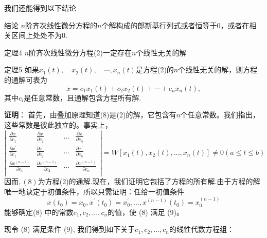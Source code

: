 \documentclass[aspectratio=169, 10pt, utf8, mathserif]{beamer}
\begin{document}
	\begin{frame}
		我们还能得到以下结论
		\begin{alertblock}{结论}
			$n$阶齐次线性微分方程的$n$个解构成的郎斯基行列式或者恒等于0，或者在相关区间上处处不为0.
		\end{alertblock}
	\end{frame}
	\begin{frame}
		\begin{block}{定理4}
			$n$阶齐次线性微分方程(2)一定存在$n$个线性无关的解
		\end{block}
		\begin{block}{定理5}
			如果$x_1(t),\quad x_2(t),\quad\cdots,x_n(t)$是方程(2)的$n$个线性无关的解，则方程的通解可表为
			\begin{equation}
				x=c_1x_1(t)+c_2x_2(t)+\cdots+c_nx_n(t),
			\end{equation}
			其中$c_i$是任意常数，且通解包含方程所有解.
		\end{block}
	\end{frame}
	\begin{frame}
		\textbf{证明}：
		首先，由叠加原理知道(8)是(2)的解，它包含有$n$个任意常数。我们指出，这些常数是彼此独立的。事实上，
		\begin{equation*}
		\left| \begin{matrix}
			\frac{\partial x}{\partial c_1}&		\frac{\partial x}{\partial c_2}&		...&		\frac{\partial x}{\partial c_n}\\
			\frac{\partial x^{\prime}}{\partial c_1}&		\frac{\partial x^{\prime}}{\partial c_2}&		...&		\frac{\partial x^{\prime}}{\partial c_n}\\
			\frac{\partial x^{(n-1)}}{\partial c_1}&		\frac{\partial x^{(n-1)}}{\partial c_2}&		...&		\frac{\partial x^{(n-1)}}{\partial c_n}\\
		\end{matrix} \right|=W[x_1(t),x_2(t),...,x_n(t)]\ne 0\left( a\le t\le b \right) 
		\end{equation*}
		因而$,(8)$为方程(2)的通解.现在，我们证明它包括了方程的所有解.由于方程的解唯一地诀定于初值条件，所以只需证明：任给一初值条件
		\begin{equation}
			x(t_0)=x_0,x^{\prime}(t_0)=x_0^{\prime},\ldots,x^{(n-1)}(t_0)=x_0^{(n-1)}
		\end{equation}
		能够确定(8) 中的常数$c_1,c_2,\ldots,c_n$的值，使 (8) 满足 (9)。
		
		现令 (8) 满足条件 (9), 我们得到如下关于$c_1,c_2,\ldots,c_n$的线性代数方程组：
	\end{frame}
\end{document}
